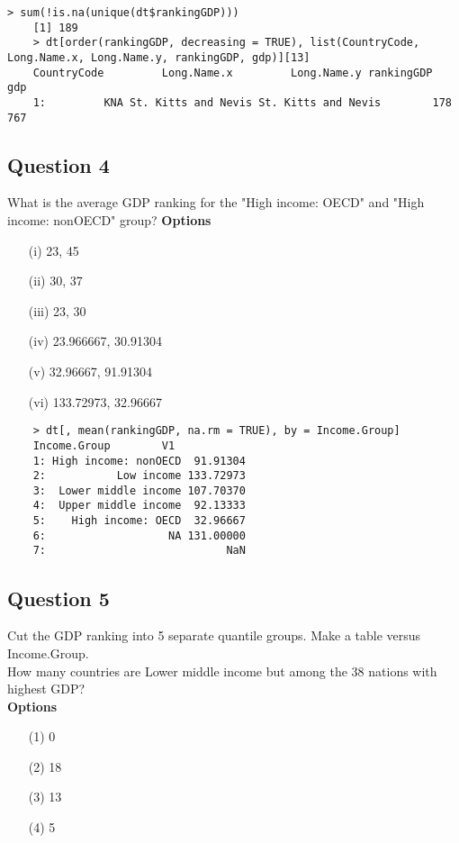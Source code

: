 \documentclass[]{article}
\begin{document}
\begin{verbatim}
> sum(!is.na(unique(dt$rankingGDP)))
	[1] 189
	> dt[order(rankingGDP, decreasing = TRUE), list(CountryCode, Long.Name.x, Long.Name.y, rankingGDP, gdp)][13]
	CountryCode         Long.Name.x         Long.Name.y rankingGDP   gdp
	1:         KNA St. Kitts and Nevis St. Kitts and Nevis        178  767 
\end{verbatim}
\newpage
\subsection*{Question 4}
What is the average GDP ranking for the "High income: OECD" and "High income: nonOECD" group?
\textbf{Options}
\begin{itemize}
\item[(i)]  23, 45
\item[(ii)] 30, 37
\item[(iii)] 23, 30
\item[(iv)] 23.966667, 30.91304
\item[(v)] 32.96667, 91.91304
\item[(vi)] 133.72973, 32.96667
\end{itemize}


\begin{framed}
	\begin{verbatim}
	> dt[, mean(rankingGDP, na.rm = TRUE), by = Income.Group]
	Income.Group        V1
	1: High income: nonOECD  91.91304
	2:           Low income 133.72973
	3:  Lower middle income 107.70370
	4:  Upper middle income  92.13333
	5:    High income: OECD  32.96667
	6:                   NA 131.00000
	7:                            NaN
	\end{verbatim}
\end{framed}
\newpage
\subsection*{Question 5}
Cut the GDP ranking into 5 separate quantile groups. Make a table versus Income.Group.
\\
 How many countries are Lower middle income but among the 38 nations with highest GDP?\\
\bigskip
\textbf{Options}
\begin{itemize}
\item[(1)] 0
\item[(2)]18
\item[(3)]13
\item[(4)] 5
\end{itemize}
\end{document}
